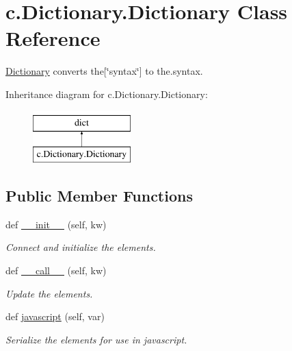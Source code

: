 \hypertarget{classc_1_1_dictionary_1_1_dictionary}{}\section{c.\+Dictionary.\+Dictionary Class Reference}
\label{classc_1_1_dictionary_1_1_dictionary}


\hyperlink{classc_1_1_dictionary_1_1_dictionary}{Dictionary} converts the\mbox{[}\char`\"{}syntax\char`\"{}\mbox{]} to the.\+syntax.  


Inheritance diagram for c.\+Dictionary.\+Dictionary\+:\begin{figure}[H]
\begin{center}
\leavevmode
\includegraphics[height=2.000000cm]{classc_1_1_dictionary_1_1_dictionary}
\end{center}
\end{figure}
\subsection*{Public Member Functions}
\begin{DoxyCompactItemize}
\item 
def \hyperlink{classc_1_1_dictionary_1_1_dictionary_ad6a8119219762f8c4da0e5011021797c}{\+\_\+\+\_\+init\+\_\+\+\_\+} (self, kw)
\begin{DoxyCompactList}\small\item\em Connect and initialize the elements. \end{DoxyCompactList}\item 
def \hyperlink{classc_1_1_dictionary_1_1_dictionary_abe20112940995369f0ea90f5a41e6f46}{\+\_\+\+\_\+call\+\_\+\+\_\+} (self, kw)
\begin{DoxyCompactList}\small\item\em Update the elements. \end{DoxyCompactList}\item 
def \hyperlink{classc_1_1_dictionary_1_1_dictionary_a9a91fbd81961f78f8e4b777db28e89f7}{javascript} (self, var)
\begin{DoxyCompactList}\small\item\em Serialize the elements for use in javascript. \end{DoxyCompactList}\end{DoxyCompactItemize}


